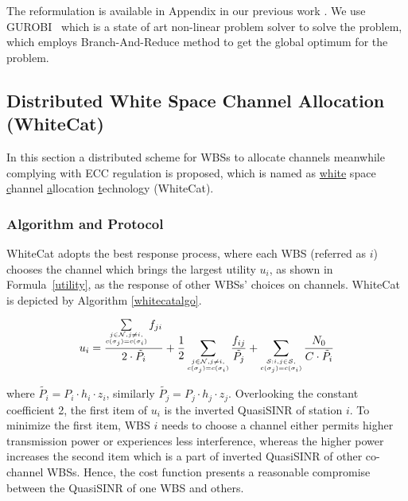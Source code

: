 \documentclass[times]{ettauth}
\theoremstyle{mytheoremstyle}
\theoremstyle{mytheoremstyle}
\theoremstyle{mytheoremstyle}
\begin{document}
The reformulation is available in Appendix in our previous work \cite{Li2012DistributedTS}.
We use GUROBI~\cite{gurobi} which is a state of art non-linear problem solver to solve the problem, which employs Branch-And-Reduce method to get the global optimum for the problem. %



\subsection{Distributed White Space Channel Allocation (WhiteCat)}
\label{whitecat}
In this section a distributed scheme for WBSs to allocate channels meanwhile complying with ECC regulation is proposed, which is named as \underline{white} space \underline{c}hannel \underline{a}llocation \underline{t}echnology (WhiteCat). 

\subsubsection{Algorithm and Protocol}
WhiteCat adopts the best response process, where each WBS (referred as $i$) chooses the channel which brings the largest utility $u_i$, as shown in Formula~\ref{utility}, as the response of other WBSs' choices on channels.
WhiteCat is depicted by Algorithm \ref{whitecatalgo}.

\begin{equation}
\label{utility}
u_i =\dfrac{\sum\limits_{\tiny\substack{j\in \mathcal{N}, j\ne i,\\ c(\sigma_j)=c(\sigma_i)}}f_{ji}}{2\cdot \tilde{P_i}} + \dfrac{1}{2}\sum_{\tiny\substack{j\in \mathcal{N}, j\ne i,\\ c(\sigma_j)=c(\sigma_i)}}\dfrac{f_{ij}}{\tilde{P_j}} + \sum_{\tiny\substack{\mathcal{S}:i,j\in \mathcal{S},\\ c(\sigma_j)=c(\sigma_i)}}\dfrac{N_0}{C\cdot \tilde{P_i}}\\
\end{equation}

where $\tilde{P_i} = P_i\cdot h_i\cdot z_i$, similarly $\tilde{P_j} = P_j\cdot h_j\cdot z_j$.
Overlooking the constant coefficient 2, the first item of $u_i$ is the inverted QuasiSINR of station $i$. 
To minimize the first item, WBS $i$ needs to choose a channel either permits higher transmission power or experiences less interference, whereas the higher power increases the second item which is a part of inverted QuasiSINR of other co-channel WBSs. 
Hence, the cost function presents a reasonable compromise between the QuasiSINR of one WBS and others.
\end{document}
